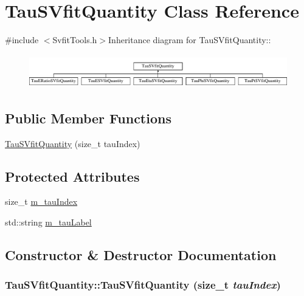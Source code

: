 \hypertarget{classTauSVfitQuantity}{
\section{TauSVfitQuantity Class Reference}
\label{classTauSVfitQuantity}
}


{\ttfamily \#include $<$SvfitTools.h$>$}Inheritance diagram for TauSVfitQuantity::\begin{figure}[H]
\begin{center}
\leavevmode
\includegraphics[height=1.48344cm]{classTauSVfitQuantity}
\end{center}
\end{figure}
\subsection*{Public Member Functions}
\begin{DoxyCompactItemize}
\item 
\hyperlink{classTauSVfitQuantity_a26607b2c038755a43b9a82c1065f8a15}{TauSVfitQuantity} (size\_\-t tauIndex)
\end{DoxyCompactItemize}
\subsection*{Protected Attributes}
\begin{DoxyCompactItemize}
\item 
size\_\-t \hyperlink{classTauSVfitQuantity_ab5bea2b1a5fed277f0ebe1a3389636e2}{m\_\-tauIndex}
\item 
std::string \hyperlink{classTauSVfitQuantity_a3845377e0a9fe8ee92687c36b45cc47d}{m\_\-tauLabel}
\end{DoxyCompactItemize}


\subsection{Constructor \& Destructor Documentation}
\hypertarget{classTauSVfitQuantity_a26607b2c038755a43b9a82c1065f8a15}{
\subsubsection[{TauSVfitQuantity}]{\setlength{\rightskip}{0pt plus 5cm}TauSVfitQuantity::TauSVfitQuantity (size\_\-t {\em tauIndex})}}
\label{classTauSVfitQuantity_a26607b2c038755a43b9a82c1065f8a15}


